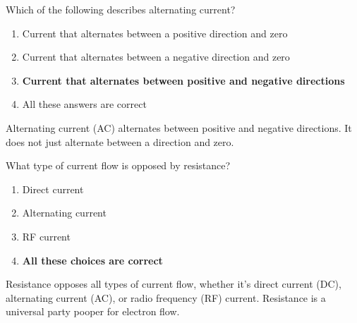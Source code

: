 \begin{tcolorbox}[colback=gray!10!white,colframe=black!75!black,title={T5A09}]
    Which of the following describes alternating current?
    \begin{enumerate}[label=\Alph*),noitemsep]
        \item Current that alternates between a positive direction and zero
        \item Current that alternates between a negative direction and zero
        \item \textbf{Current that alternates between positive and negative directions}
        \item All these answers are correct
    \end{enumerate}
\end{tcolorbox}
Alternating current (AC) alternates between positive and negative directions. It does not just alternate between a direction and zero.


\begin{tcolorbox}[colback=gray!10!white,colframe=black!75!black,title={T5A11}]
    What type of current flow is opposed by resistance?
    \begin{enumerate}[label=\Alph*),noitemsep]
        \item Direct current
        \item Alternating current
        \item RF current
        \item \textbf{All these choices are correct}
    \end{enumerate}
\end{tcolorbox}
Resistance opposes all types of current flow, whether it's direct current (DC), alternating current (AC), or radio frequency (RF) current. Resistance is a universal party pooper for electron flow.


